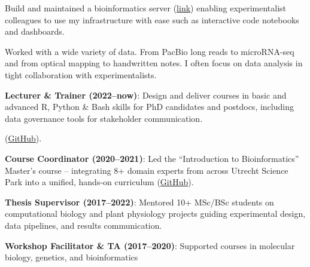 \documentclass[a4paper,10pt]{article}
\begin{document}
{\begin{adjustbox}{valign=t}
\begin{minipage}[t]{0.6\textwidth}
\begin{description}
  \item Build and maintained a bioinformatics server 
    (\href{https://lauralwd.github.io/blog/post-mpp-server/}{link}) 
    enabling experimentalist colleagues to use my infrastructure with ease such as interactive code notebooks and dashboards.
  \item Worked with a wide variety of data. 
    From PacBio long reads to microRNA-seq and from optical mapping to handwritten notes.
    I often focus on data analysis in tight collaboration with experimentalists.
\end{description}

\end{minipage}%
\end{adjustbox}%
}
\newpage

\begin{description}
  \raggedright
  \item \textbf{Lecturer \& Trainer (2022–now)}: Design and deliver courses in 
    basic and advanced R, Python \& Bash skills for PhD candidates and postdocs, 
    including data governance tools for stakeholder communication.

    (\href{https://github.com/lauralwd/professional_education}{GitHub}).
  \item \textbf{Course Coordinator (2020–2021)}: Led the “Introduction to Bioinformatics” Master’s course 
    -- integrating 8+ domain experts 
    from across Utrecht Science Park into a unified, hands-on curriculum 
    (\href{https://lauralwd.github.io/metagenomicspractical/}{GitHub}).
  \item \textbf{Thesis Supervisor (2017–2022)}: Mentored 10+ MSc/BSc students on computational biology and 
    plant physiology projects guiding experimental design, data pipelines, and results communication.
  \item \textbf{Workshop Facilitator \& TA (2017–2020)}: Supported courses in molecular biology, genetics, and bioinformatics
\end{description}
\end{document}
